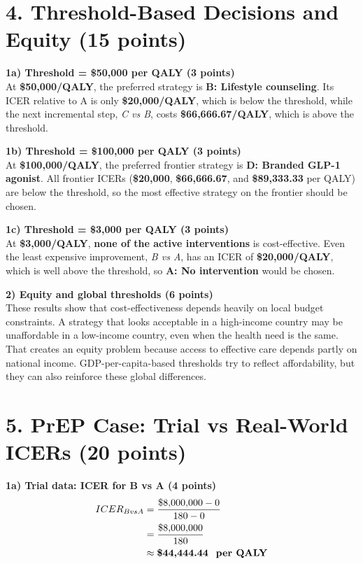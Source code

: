 \documentclass[11pt, letterpaper]{article}
\begin{document}
\section*{4. Threshold-Based Decisions and Equity (15 points)}

\textbf{1a) Threshold = \$50,000 per QALY (3 points)} \\
At \textbf{\$50,000/QALY}, the preferred strategy is \textbf{B: Lifestyle counseling}. Its ICER relative to A is only \textbf{\$20,000/QALY}, which is below the threshold, while the next incremental step, \textit{C vs B}, costs \textbf{\$66,666.67/QALY}, which is above the threshold.

\textbf{1b) Threshold = \$100,000 per QALY (3 points)} \\
At \textbf{\$100,000/QALY}, the preferred frontier strategy is \textbf{D: Branded GLP-1 agonist}. All frontier ICERs (\textbf{\$20,000}, \textbf{\$66,666.67}, and \textbf{\$89,333.33} per QALY) are below the threshold, so the most effective strategy on the frontier should be chosen.

\textbf{1c) Threshold = \$3,000 per QALY (3 points)} \\
At \textbf{\$3,000/QALY}, \textbf{none of the active interventions} is cost-effective. Even the least expensive improvement, \textit{B vs A}, has an ICER of \textbf{\$20,000/QALY}, which is well above the threshold, so \textbf{A: No intervention} would be chosen.

\textbf{2) Equity and global thresholds (6 points)} \\
These results show that cost-effectiveness depends heavily on local budget constraints. A strategy that looks acceptable in a high-income country may be unaffordable in a low-income country, even when the health need is the same. That creates an equity problem because access to effective care depends partly on national income. GDP-per-capita-based thresholds try to reflect affordability, but they can also reinforce these global differences.

\section*{5. PrEP Case: Trial vs Real-World ICERs (20 points)}

\textbf{1a) Trial data: ICER for B vs A (4 points)} \\
\begin{align*}
ICER_{B vs A} &= \frac{\$8{,}000{,}000 - 0}{180 - 0} \\
&= \frac{\$8{,}000{,}000}{180} \\
&\approx \textbf{\$44{,}444.44 \text{ per QALY}}
\end{align*}
\end{document}
